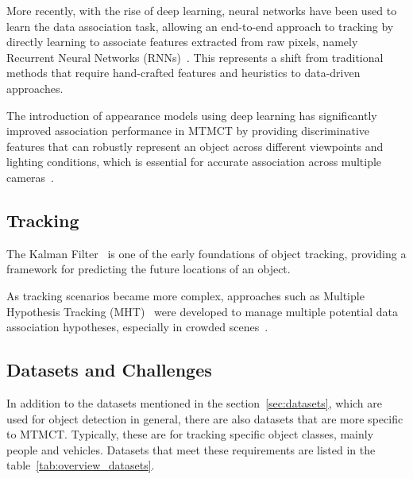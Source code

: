 More recently, with the rise of deep learning, neural networks have been used to learn the data association task, allowing an end-to-end approach to tracking by directly learning to associate features extracted from raw pixels, namely Recurrent Neural Networks (RNNs)~\cite{Milan16b}. This represents a shift from traditional methods that require hand-crafted features and heuristics to data-driven approaches.

The introduction of appearance models using deep learning has significantly improved association performance in MTMCT by providing discriminative features that can robustly represent an object across different viewpoints and lighting conditions, which is essential for accurate association across multiple cameras~\cite{Schroff15}.

\subsection{Tracking}\label{subsec:milestone_tracking}
The Kalman Filter~\cite{Kalman60} is one of the early foundations of object tracking, providing a framework for predicting the future locations of an object.

As tracking scenarios became more complex, approaches such as Multiple Hypothesis Tracking (MHT)~\cite{Blackman04} were developed to manage multiple potential data association hypotheses, especially in crowded scenes~\cite{Reid79}.

\subsection{Datasets and Challenges}\label{subsec:datasets_and_challenges}
In addition to the datasets mentioned in the section~\ref{sec:datasets}, which are used for object detection in general, there are also datasets that are more specific to MTMCT. Typically, these are for tracking specific object classes, mainly people and vehicles. Datasets that meet these requirements are listed in the table~\ref{tab:overview_datasets}.

